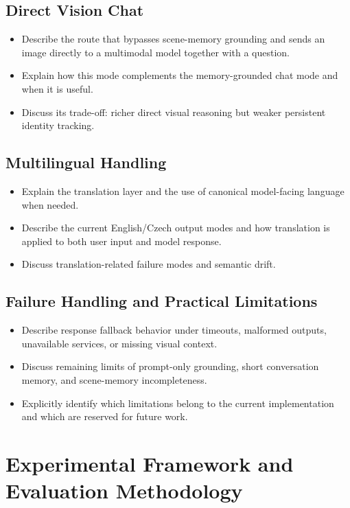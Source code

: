 \documentclass[
  digital,     %
  oneside,     %
  nosansbold,  %
  nocolorbold, %
  lof,         %
  lot,         %
]{fithesis4}
\begin{document}
\section{Direct Vision Chat}
\begin{itemize}
    \item Describe the route that bypasses scene-memory grounding and sends an image directly to a multimodal model together with a question.
    \item Explain how this mode complements the memory-grounded chat mode and when it is useful.
    \item Discuss its trade-off: richer direct visual reasoning but weaker persistent identity tracking.
\end{itemize}

\section{Multilingual Handling}
\begin{itemize}
    \item Explain the translation layer and the use of canonical model-facing language when needed.
    \item Describe the current English/Czech output modes and how translation is applied to both user input and model response.
    \item Discuss translation-related failure modes and semantic drift.
\end{itemize}

\section{Failure Handling and Practical Limitations}
\begin{itemize}
    \item Describe response fallback behavior under timeouts, malformed outputs, unavailable services, or missing visual context.
    \item Discuss remaining limits of prompt-only grounding, short conversation memory, and scene-memory incompleteness.
    \item Explicitly identify which limitations belong to the current implementation and which are reserved for future work.
\end{itemize}

\chapter{Experimental Framework and Evaluation Methodology}
\end{document}

